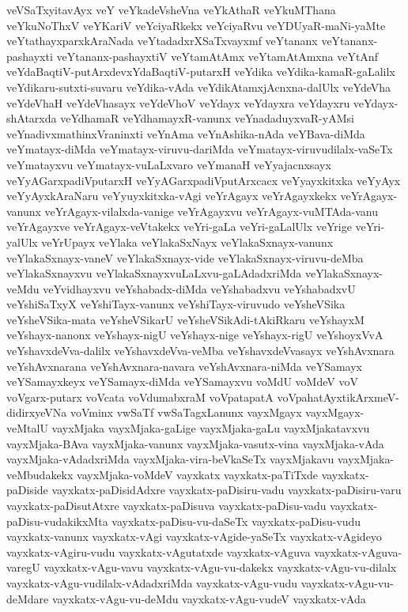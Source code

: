 {veVSaTxyitavAyx
veY
veYkadeVsheVna
veYkAthaR
veYkuMThana
veYkuNoThxV
veYKariV
veYciyaRkekx
veYciyaRvu
veYDUyaR-maNi-yaMte
veYtathayxparxkAraNada
veYtadadxrXSaTxvayxmf
veYtananx
veYtananx-pashayxti
veYtananx-pashayxtiV
veYtamAtAmx
veYtamAtAmxna
veYtAnf
veYdaBaqtiV-putArxdevxYdaBaqtiV-putarxH
veYdika
veYdika-kamaR-gaLalilx
veYdikaru-sutxti-suvaru
veYdika-vAda
veYdikAtamxjAcnxna-dalUlx
veYdeVha
veYdeVhaH
veYdeVhasayx
veYdeVhoV
veYdayx
veYdayxra
veYdayxru
veYdayx-shAtarxda
veYdhamaR
veYdhamayxR-vanunx
veYnadaduyxvaR-yAMsi
veYnadivxmathinxVraninxti
veYnAma
veYnAshika-nAda
veYBava-diMda
veYmatayx-diMda
veYmatayx-viruvu-dariMda
veYmatayx-viruvudilalx-vaSeTx
veYmatayxvu
veYmatayx-vuLaLxvaro
veYmanaH
veYyajacnxsayx
veYyAGarxpadiVputarxH
veYyAGarxpadiVputArxcacx
veYyayxkitxka
veYyAyx
veYyAyxkAraNaru
veYyuyxkitxka-vAgi
veYrAgayx
veYrAgayxkekx
veYrAgayx-vanunx
veYrAgayx-vilalxda-vanige
veYrAgayxvu
veYrAgayx-vuMTAda-vanu
veYrAgayxve
veYrAgayx-veVtakekx
veYri-gaLa
veYri-gaLalUlx
veYrige
veYri-yalUlx
veYrUpayx
veYlaka
veYlakaSxNayx
veYlakaSxnayx-vanunx
veYlakaSxnayx-vaneV
veYlakaSxnayx-vide
veYlakaSxnayx-viruvu-deMba
veYlakaSxnayxvu
veYlakaSxnayxvuLaLxvu-gaLAdadxriMda
veYlakaSxnayx-veMdu
veYvidhayxvu
veYshabadx-diMda
veYshabadxvu
veYshabadxvU
veYshiSaTxyX
veYshiTayx-vanunx
veYshiTayx-viruvudo
veYsheVSika
veYsheVSika-mata
veYsheVSikarU
veYsheVSikAdi-tAkiRkaru
veYshayxM
veYshayx-nanonx
veYshayx-nigU
veYshayx-nige
veYshayx-rigU
veYshoyxVvA
veYshavxdeVva-dalilx
veYshavxdeVva-veMba
veYshavxdeVvasayx
veYshAvxnara
veYshAvxnarana
veYshAvxnara-navara
veYshAvxnara-niMda
veYSamayx
veYSamayxkeyx
veYSamayx-diMda
veYSamayxvu
voMdU
voMdeV
voV
voVgarx-putarx
voVcata
voVdumabxraM
voVpatapatA
voVpahatAyxtikArxmeV-didirxyeVNa
voVminx
vwSaTf
vwSaTagxLanunx
vayxMgayx
vayxMgayx-veMtalU
vayxMjaka
vayxMjaka-gaLige
vayxMjaka-gaLu
vayxMjakatavxvu
vayxMjaka-BAva
vayxMjaka-vanunx
vayxMjaka-vasutx-vina
vayxMjaka-vAda
vayxMjaka-vAdadxriMda
vayxMjaka-vira-beVkaSeTx
vayxMjakavu
vayxMjaka-veMbudakekx
vayxMjaka-voMdeV
vayxkatx
vayxkatx-paTiTxde
vayxkatx-paDiside
vayxkatx-paDisidAdxre
vayxkatx-paDisiru-vadu
vayxkatx-paDisiru-varu
vayxkatx-paDisutAtxre
vayxkatx-paDisuva
vayxkatx-paDisu-vadu
vayxkatx-paDisu-vudakikxMta
vayxkatx-paDisu-vu-daSeTx
vayxkatx-paDisu-vudu
vayxkatx-vanunx
vayxkatx-vAgi
vayxkatx-vAgide-yaSeTx
vayxkatx-vAgideyo
vayxkatx-vAgiru-vudu
vayxkatx-vAgutatxde
vayxkatx-vAguva
vayxkatx-vAguva-varegU
vayxkatx-vAgu-vavu
vayxkatx-vAgu-vu-dakekx
vayxkatx-vAgu-vu-dilalx
vayxkatx-vAgu-vudilalx-vAdadxriMda
vayxkatx-vAgu-vudu
vayxkatx-vAgu-vu-deMdare
vayxkatx-vAgu-vu-deMdu
vayxkatx-vAgu-vudeV
vayxkatx-vAda
}
